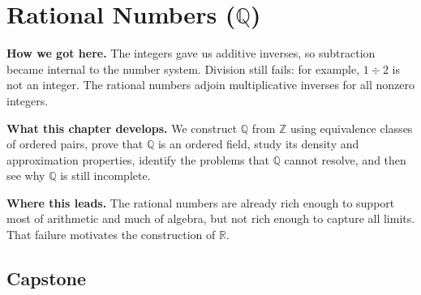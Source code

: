 \chapter{Rational Numbers ($\mathbb{Q}$)}
\label{ch:rationals}


\begin{tcolorbox}[
  colback=gray!6,
  colframe=gray!40,
  arc=2pt,
  left=8pt, right=8pt, top=6pt, bottom=6pt,
  title={\small\textbf{Structural Roadmap}},
  fonttitle=\small\bfseries
]
\noindent\textbf{How we got here.}
The integers gave us additive inverses, so subtraction became internal to the number system.
Division still fails: for example, $1 \div 2$ is not an integer.  The rational numbers adjoin
multiplicative inverses for all nonzero integers.

\medskip
\noindent\textbf{What this chapter develops.}
We construct $\mathbb{Q}$ from $\mathbb{Z}$ using equivalence classes of ordered pairs, prove that
$\mathbb{Q}$ is an ordered field, study its density and approximation properties, identify the
problems that $\mathbb{Q}$ cannot resolve, and then see why $\mathbb{Q}$ is still incomplete.

\medskip
\noindent\textbf{Where this leads.}
The rational numbers are already rich enough to support most of arithmetic and much of algebra, but
not rich enough to capture all limits.  That failure motivates the construction of $\mathbb{R}$.
\end{tcolorbox}






\section*{Capstone}
